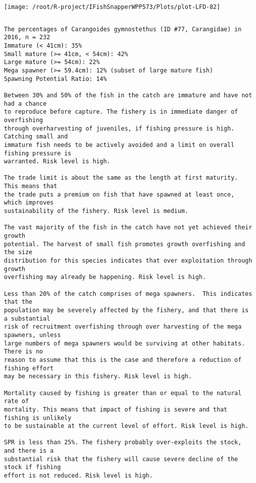 \documentclass{report}\usepackage[]{graphicx}\usepackage[]{color}
\makeatletter
\def\maxwidth{ %
  \ifdim\Gin@nat@width>\linewidth
    \linewidth
  \else
    \Gin@nat@width
  \fi
}
\newenvironment{kframe}{%
 \def\at@end@of@kframe{}%
 \ifinner\ifhmode%
  \def\at@end@of@kframe{\end{minipage}}%
  \begin{minipage}{\columnwidth}%
 \fi\fi%
 \def\FrameCommand##1{\hskip\@totalleftmargin \hskip-\fboxsep
 \colorbox{shadecolor}{##1}\hskip-\fboxsep
     \hskip-\linewidth \hskip-\@totalleftmargin \hskip\columnwidth}%
 \MakeFramed {\advance\hsize-\width
   \@totalleftmargin\z@ \linewidth\hsize
   \@setminipage}}%
 {\par\unskip\endMakeFramed%
 \at@end@of@kframe}
\newenvironment{knitrout}{}{} %
\makeatother
\begin{document}
\begin{knitrout}
\texttt{[image: /root/R-project/IFishSnapperWPP573/Plots/plot-LFD-82]} 
\begin{kframe}\begin{verbatim}
\end{verbatim}
\end{kframe}
\clearpage
\newpage
\begin{kframe}\begin{verbatim}The percentages of Carangoides gymnostethus (ID #77, Carangidae) in 2016, n = 232
Immature (< 41cm): 35%
Small mature (>= 41cm, < 54cm): 42%
Large mature (>= 54cm): 22%
Mega spawner (>= 59.4cm): 12% (subset of large mature fish)
Spawning Potential Ratio: 14%
 
Between 30% and 50% of the fish in the catch are immature and have not had a chance
to reproduce before capture. The fishery is in immediate danger of overfishing
through overharvesting of juveniles, if fishing pressure is high.  Catching small and
immature fish needs to be actively avoided and a limit on overall fishing pressure is
warranted. Risk level is high.

The trade limit is about the same as the length at first maturity.  This means that
the trade puts a premium on fish that have spawned at least once, which improves
sustainability of the fishery. Risk level is medium.

The vast majority of the fish in the catch have not yet achieved their growth
potential. The harvest of small fish promotes growth overfishing and the size
distribution for this species indicates that over exploitation through growth
overfishing may already be happening. Risk level is high.

Less than 20% of the catch comprises of mega spawners.  This indicates that the
population may be severely affected by the fishery, and that there is a substantial
risk of recruitment overfishing through over harvesting of the mega spawners, unless
large numbers of mega spawners would be surviving at other habitats. There is no
reason to assume that this is the case and therefore a reduction of fishing effort
may be necessary in this fishery. Risk level is high.
 
Mortality caused by fishing is greater than or equal to the natural rate of
mortality. This means that impact of fishing is severe and that fishing is unlikely
to be sustainable at the current level of effort. Risk level is high.
 
SPR is less than 25%. The fishery probably over-exploits the stock, and there is a
substantial risk that the fishery will cause severe decline of the stock if fishing
effort is not reduced. Risk level is high.
 

\end{verbatim}
\end{kframe}
\end{knitrout}
\end{document}
